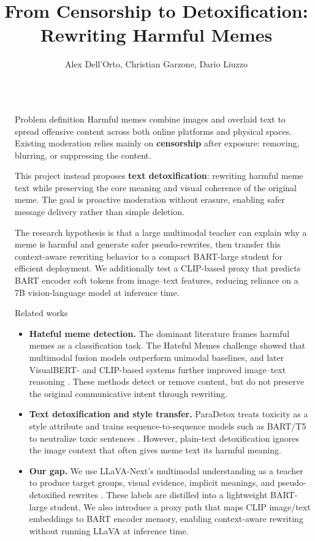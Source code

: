 \documentclass[final]{beamer}
\title{From Censorship to Detoxification:\\Rewriting Harmful Memes}
\author{Alex Dell'Orto, Christian Garzone, Dario Liuzzo}
\institute{Group 31 \samelineand EE-559: Deep Learning, EPFL, 2026}
\newlength{\sepwidth}
\newlength{\colwidth}
\newcommand{\separatorcolumn}{\begin{column}{\sepwidth}\end{column}}
\newcommand{\smallgap}{\vspace{0.18em}}
\begin{document}
\begin{frame}[t]
\begin{columns}[t]
\separatorcolumn

\begin{column}{\colwidth}

    \begin{block}{Problem definition}
    Harmful memes combine images and overlaid text to spread offensive content
    across both online platforms and physical spaces. Existing moderation
    relies mainly on \textbf{censorship} after exposure: removing, blurring, or
    suppressing the content.

    \smallgap
    This project instead proposes \textbf{text detoxification}: rewriting
    harmful meme text while preserving the core meaning and visual
    coherence of the original meme. The goal is proactive moderation without
    erasure, enabling safer message delivery rather than simple deletion.

    \smallgap
    The research hypothesis is that a large multimodal teacher can explain why
    a meme is harmful and generate safer pseudo-rewrites, then transfer this
    context-aware rewriting behavior to a compact BART-large student for
    efficient deployment. We additionally test a CLIP-based proxy that predicts
    BART encoder soft tokens from image--text features, reducing reliance on a
    7B vision-language model at inference time.
    \end{block}

    \begin{block}{Related works}
    \begin{itemize}
        \item \textbf{Hateful meme detection.} The dominant literature frames
        harmful memes as a classification task. The Hateful Memes challenge
        showed that multimodal fusion models outperform unimodal baselines, and
        later VisualBERT- and CLIP-based systems further improved image--text
        reasoning \cite{kiela2020hateful,li2019visualbert,radford2021learning}.
        These methods detect or remove content, but do not preserve the
        original communicative intent through rewriting.
        \item \textbf{Text detoxification and style transfer.} ParaDetox treats
        toxicity as a style attribute and trains sequence-to-sequence models
        such as BART/T5 to neutralize toxic sentences \cite{logacheva2022paradetox}.
        However, plain-text detoxification ignores the image context that often
        gives meme text its harmful meaning.
        \item \textbf{Our gap.} We use LLaVA-Next's multimodal understanding as
        a teacher to produce target groups, visual evidence, implicit meanings,
        and pseudo-detoxified rewrites \cite{liu2024llava}. These labels are
        distilled into a lightweight BART-large student. We also introduce a
        proxy path that maps CLIP image/text embeddings to BART encoder memory,
        enabling context-aware rewriting without running LLaVA at inference
        time.
    \end{itemize}
    \end{block}


\end{column}
\end{columns}
\end{frame}
\end{document}
